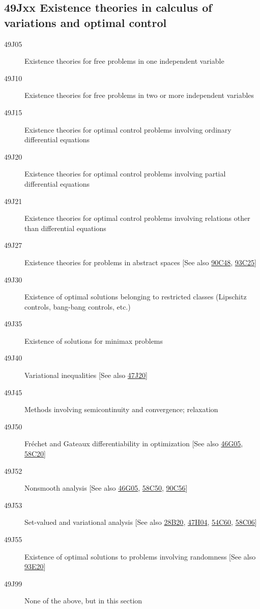 \documentclass[letterpaper]{article}
\begin{document}
\subsection*{49Jxx  Existence theories in calculus of variations  and optimal control }\label{49Jxx}
\begin{description}  
\item [49J05]\label{49J05} Existence theories for free problems in one independent variable
\item [49J10]\label{49J10} Existence theories for free problems in two or more independent variables
\item [49J15]\label{49J15} Existence theories for optimal control problems involving ordinary differential equations
\item [49J20]\label{49J20} Existence theories for optimal control problems involving partial differential equations
\item [49J21]\label{49J21} Existence theories for optimal control problems involving relations other than differential equations
\item [49J27]\label{49J27} Existence theories for problems in abstract spaces [See also \hyperref[90C48]{90C48}, \hyperref[93C25]{93C25}]
\item [49J30]\label{49J30} Existence of optimal solutions belonging to restricted classes (Lipschitz controls, bang-bang controls, etc.)
\item [49J35]\label{49J35} Existence of solutions for minimax problems
\item [49J40]\label{49J40} Variational inequalities [See also \hyperref[47J20]{47J20}]
\item [49J45]\label{49J45} Methods involving semicontinuity and convergence; relaxation
\item [49J50]\label{49J50} Fr\'{e}chet and Gateaux differentiability in optimization [See also \hyperref[46G05]{46G05}, \hyperref[58C20]{58C20}]
\item [49J52]\label{49J52} Nonsmooth analysis [See also \hyperref[46G05]{46G05}, \hyperref[58C50]{58C50}, \hyperref[90C56]{90C56}]
\item [49J53]\label{49J53} Set-valued and variational analysis [See also \hyperref[28B20]{28B20}, \hyperref[47H04]{47H04}, \hyperref[54C60]{54C60}, \hyperref[58C06]{58C06}]
\item [49J55]\label{49J55} Existence of optimal solutions to problems involving randomness [See also \hyperref[93E20]{93E20}]
\item [49J99]\label{49J99} None of the above, but in this section  
\end{description}
\end{document}
